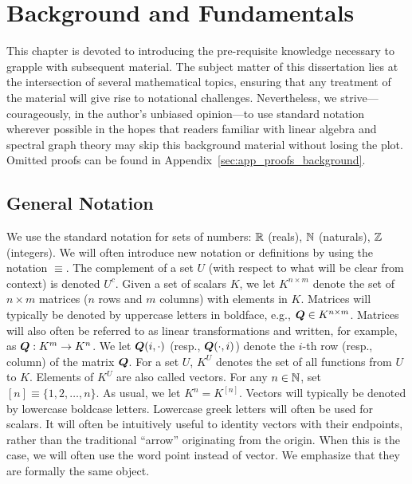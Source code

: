 \chapter{Background and Fundamentals}
\label{chap:background}

This chapter is devoted to introducing the  pre-requisite knowledge necessary to grapple with subsequent material. The subject matter of this dissertation lies at the intersection of several mathematical topics, ensuring that any treatment  of the material will give rise to notational challenges. Nevertheless, we strive---courageously, in the author's unbiased opinion---to use standard notation wherever possible in the hopes that readers familiar with linear algebra and spectral graph theory may skip this background material without losing the plot. Omitted proofs  can be found  in  Appendix~\ref{sec:app_proofs_background}. 


\section{General Notation}
\label{sec:background_general}
We use the standard notation for sets of numbers: $\mathbb{R}$ (reals), $\mathbb{N}$ (naturals), $\mathbb{Z}$ (integers).  
We will often introduce new notation or definitions by using the notation $\equiv$. The complement of a set $U$ (with respect to what will be clear from context) is denoted $U^c$. 
Given a set of scalars $K$, we let $K^{n\times m}$ denote the set of $n\times m$ matrices ($n$ rows and $m$ columns) with elements in $K$. Matrices will typically be denoted by uppercase letters in boldface, e.g., $\vb*{Q}\in K^{n\times m}$. Matrices will also often be referred to as linear transformations and written, for example, as $\vb*{Q}:K^m \to K^n$. 
We let $\vb*{Q}(i,\cdot)$ (resp., $\vb*{Q}(\cdot,i)$) denote the $i$-th row (resp., column) of the matrix $\vb*{Q}$. 
For a set $U$, $K^U$ denotes the set of all functions from $U$ to $K$.  Elements of $K^U$ are also called vectors. For any $n\in\mathbb{N}$, set $[n]\equiv \{1,2,\dots,n\}$. As usual, we let $K^n=K^{[n]}$. Vectors will typically be denoted by lowercase boldcase letters. Lowercase  greek letters will often be used for scalars. It will often  be intuitively useful to identity vectors with their endpoints, rather than the traditional ``arrow'' originating from the origin. When this is the case, we will often use the word point instead of vector. We emphasize that they are formally the same object. 


